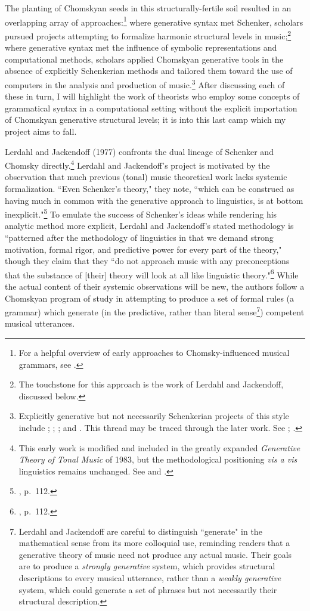 The planting of Chomskyan seeds in this structurally-fertile soil resulted in an overlapping array of approaches:\footnote{For a helpful overview of early approaches to Chomsky-influenced musical grammars, see \cite{roads1979}.}  where generative syntax met Schenker, scholars pursued projects attempting to formalize harmonic structural levels in music;\footnote{The touchstone for this approach is the work of Lerdahl and Jackendoff, discussed below.} where generative syntax met the influence of symbolic representations and computational methods, scholars applied Chomskyan generative tools in the absence of explicitly Schenkerian methods and tailored them toward the use of computers in the analysis and production of music.\footnote{Explicitly generative but not necessarily Schenkerian projects of this style include \cite{winograd1968}; \cite{laske1972}; \cite{laske1975}; and \cite{steedman1984}. This thread may be traced through the later work.  See \cite{keller2007}; \cite{rohrmeier2011}.}  After discussing each of these in turn, I will highlight the work of theorists who employ some concepts of grammatical syntax in a computational setting without the explicit importation of Chomskyan generative structural levels; it is into this last camp which my project aims to fall.

Lerdahl and Jackendoff (1977) confronts the dual lineage of Schenker and Chomsky directly.\footnote{This early work is modified and included in the greatly expanded \emph{Generative Theory of Tonal Music} of 1983, but the methodological positioning \emph{vis a vis} linguistics remains unchanged.  See \cite{lj1977} and \cite{lj1983}.}  Lerdahl and Jackendoff's project is motivated by the observation that much previous (tonal) music theoretical work lacks systemic formalization.  ``Even Schenker's theory," they note, ``which can be construed as having much in common with the generative approach to linguistics, is at bottom inexplicit."\footnote{\cite{lj1977}, p.\ 112.}  To emulate the success of Schenker's ideas while rendering his analytic method more explicit, Lerdahl and Jackendoff's stated methodology is ``patterned after the methodology of linguistics in that we demand strong motivation, formal rigor, and predictive power for every part of the theory," though they claim that they ``do not approach music with any preconceptions that the substance of [their] theory will look at all like linguistic theory."\footnote{\cite{lj1977}, p.\ 112.}  While the actual content of their systemic observations will be new, the authors follow a Chomskyan program of study in attempting to produce a set of formal rules (a grammar) which generate (in the predictive, rather than literal sense\footnote{Lerdahl and Jackendoff are careful to distinguish ``generate" in the mathematical sense from its more colloquial use, reminding readers that a generative theory of music need not produce any actual music.  Their goals are to produce a \emph{strongly generative} system, which provides structural descriptions to every musical utterance, rather than a \emph{weakly generative} system, which could generate a set of phrases but not necessarily their structural description.}) competent musical utterances.

